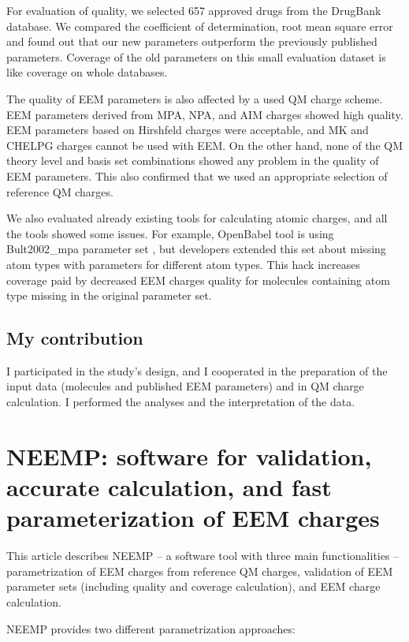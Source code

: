 For evaluation of quality, we selected 657 approved drugs from the DrugBank
database. We compared the coefficient of determination, root mean square error
and found out that our new parameters outperform the previously published
parameters. Coverage of the old parameters on this small evaluation dataset
is like coverage on whole databases.

The quality of EEM parameters is also affected by a used QM charge scheme.
EEM parameters derived from MPA, NPA, and AIM charges showed high quality.
EEM parameters based on Hirshfeld charges were acceptable, and MK and CHELPG
charges cannot be used with EEM.  On the other hand, none of the QM theory level
and basis set combinations showed any problem in the quality of EEM parameters.
This also confirmed that we used an appropriate selection of reference QM
charges.

We also evaluated already existing tools for calculating atomic charges,
and all the tools showed some issues. For example, OpenBabel tool \cite{openbabel}  is using
Bult2002\_mpa parameter set \cite{Bultinck2002}, but developers extended this
set about missing atom types with parameters for different atom types. This hack
increases coverage paid by decreased EEM charges quality for molecules
containing atom type missing in the original parameter set.  

\subsection{My contribution}

I participated in the study's design, and I cooperated in the preparation of
the input data (molecules and published EEM parameters) and in QM charge 
calculation. I performed the analyses and the interpretation of the data.

\section{NEEMP: software for validation, accurate calculation, and fast
parameterization of EEM charges} \label{sec:neemp-article}

This article describes NEEMP -- a software tool with three main
functionalities -- parametrization of EEM charges from reference QM charges,
validation of EEM parameter sets (including quality and coverage calculation),
and EEM charge calculation.

NEEMP provides two different parametrization approaches:

